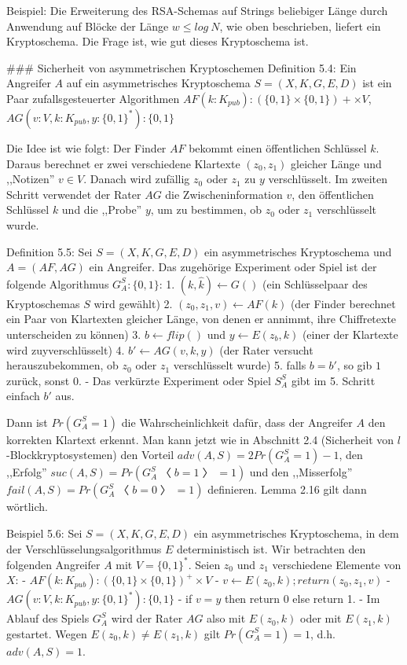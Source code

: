 \documentclass[a4paper]{article}
\begin{document}
\begin{multicols}{3}
{{{Beispiel: Die Erweiterung des RSA-Schemas auf Strings beliebiger Länge durch Anwendung auf Blöcke der Länge $w\leq log\ N$, wie oben beschrieben, liefert ein Kryptoschema. Die Frage ist, wie gut dieses Kryptoschema ist.

### Sicherheit von asymmetrischen Kryptoschemen
Definition 5.4: Ein Angreifer $A$ auf ein asymmetrisches Kryptoschema $S= (X,K,G,E,D)$ ist ein Paar zufallsgesteuerter Algorithmen $AF(k:K_{pub}):(\{0,1\}\times\{0,1\})+\times V$, $AG(v:V,k:K_{pub}, y:\{0,1\}^*) :\{0,1\}$

Die Idee ist wie folgt: Der Finder $AF$ bekommt einen öffentlichen Schlüssel $k$. Daraus berechnet er zwei verschiedene Klartexte $(z_0,z_1)$ gleicher Länge und ,,Notizen'' $v\in V$. Danach wird zufällig $z_0$ oder $z_1$ zu $y$ verschlüsselt. Im zweiten Schritt verwendet der Rater $AG$ die Zwischeninformation $v$, den öffentlichen Schlüssel $k$ und die ,,Probe'' $y$, um zu bestimmen, ob $z_0$ oder $z_1$ verschlüsselt wurde.

Definition 5.5: Sei $S=(X,K,G,E,D)$ ein asymmetrisches Kryptoschema und $A=(AF,AG)$ ein Angreifer. Das zugehörige Experiment oder Spiel ist der folgende Algorithmus $G^S_A:\{0,1\}$:
1. $(k,\hat{k})\leftarrow G()$ (ein Schlüsselpaar des Kryptoschemas $S$ wird gewählt)
2. $(z_0,z_1,v)\leftarrow AF(k)$ (der Finder berechnet ein Paar von Klartexten gleicher Länge, von denen er annimmt, ihre Chiffretexte unterscheiden zu können)
3. $b\leftarrow flip()$ und $y\leftarrow E(z_b,k)$ (einer der Klartexte wird zuyverschlüsselt)
4. $b′\leftarrow AG(v,k,y)$ (der Rater versucht herauszubekommen, ob $z_0$ oder $z_1$ verschlüsselt wurde)
5. falls $b=b′$, so gib $1$ zurück, sonst $0$.
- Das verkürzte Experiment oder Spiel $S^S_A$ gibt im 5. Schritt einfach $b′$ aus.

Dann ist $Pr(G^S_A= 1)$ die Wahrscheinlichkeit dafür, dass der Angreifer $A$ den korrekten Klartext erkennt. Man kann jetzt wie in Abschnitt 2.4 (Sicherheit von $l$-Blockkryptosystemen) den Vorteil $adv(A,S) = 2 Pr(G^S_A = 1)- 1$, den ,,Erfolg'' $suc(A,S) = Pr(G^S_A〈b = 1〉 = 1)$ und den ,,Misserfolg'' $fail(A,S) =Pr(G^S_A〈b= 0〉= 1)$ definieren. Lemma 2.16 gilt dann wörtlich.

Beispiel 5.6: Sei $S=(X,K,G,E,D)$ ein asymmetrisches Kryptoschema, in dem der Verschlüsselungsalgorithmus $E$ deterministisch ist. Wir betrachten den folgenden Angreifer $A$ mit $V=\{0,1\}^*$. Seien $z_0$ und $z_1$ verschiedene Elemente von $X$:
- $AF(k:K_{pub}) : (\{0,1\}\times\{0,1\})^+\times V$ 
  - $v\leftarrow E(z_0,k);return(z_0,z_1,v)$
- $AG(v:V,k:K_{pub},y:\{0,1\}^*):\{0,1\}$ 
  - if $v=y$ then return 0 else return 1.
- Im Ablauf des Spiels $G^S_A$ wird der Rater $AG$ also mit $E(z_0,k)$ oder mit $E(z_1,k)$ gestartet. Wegen $E(z_0,k)\not=E(z_1,k)$ gilt $Pr(G^S_A=1)=1$, d.h. $adv(A,S)=1$.

}}}
\end{multicols}
\end{document}
